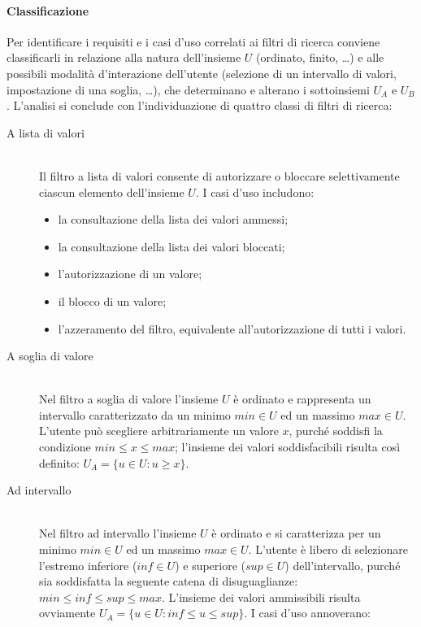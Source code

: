 \paragraph{Classificazione}
Per identificare i requisiti e i casi d'uso correlati ai filtri di ricerca conviene classificarli in relazione alla natura dell'insieme $U$ (ordinato, finito, \ldots) e alle possibili modalità d'interazione dell'utente (selezione di un intervallo di valori, impostazione di una soglia, \ldots), che determinano e alterano i sottoinsiemi $U_A$ e $U_B$. L'analisi si conclude con l'individuazione di quattro classi di filtri di ricerca:
\begin{description}
	\item[A lista di valori] \hfill \\
	Il filtro a lista di valori consente di autorizzare o bloccare selettivamente ciascun elemento dell'insieme $U$. I casi d'uso includono:
	\begin{itemize}
		\item la consultazione della lista dei valori ammessi;
		\item la consultazione della lista dei valori bloccati;
		\item l'autorizzazione di un valore;
		\item il blocco di un valore;
		\item l'azzeramento del filtro, equivalente all'autorizzazione di tutti i valori.
	\end{itemize}
	\item[A soglia di valore] \hfill \\
	Nel filtro a soglia di valore l'insieme $U$ è ordinato e rappresenta un intervallo caratterizzato da un minimo $min \in U$ ed un massimo $max \in U$. L'utente può scegliere arbitrariamente un valore $x$, purché soddisfi la condizione $min \leq x \leq max$; l'insieme dei valori soddisfacibili risulta così definito: $U_A = \lbrace u \in U : u \geq x \rbrace$.
	\item[Ad intervallo] \hfill \\
	Nel filtro ad intervallo l'insieme $U$ è ordinato e si caratterizza per un minimo $min \in U$ ed un massimo $max \in U$. L'utente è libero di selezionare l'estremo inferiore ($inf \in U$) e superiore ($sup\in U$) dell'intervallo, purché sia soddisfatta la seguente catena di disuguaglianze: $min \leq inf \leq sup \leq max$. L'insieme dei valori ammissibili risulta ovviamente $U_A = \lbrace u \in U : inf \leq u \leq sup \rbrace$. I casi d'uso annoverano:
	\begin{itemize}

\end{itemize}
\end{description}
